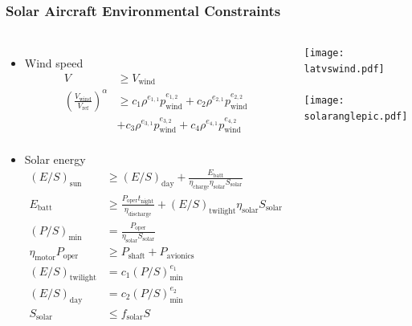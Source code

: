 \documentclass{beamer}
\begin{document}
\begin{frame}
    \frametitle{Solar Aircraft Environmental Constraints}
    
    \begin{columns}
    \tiny
    \begin{itemize}
        \item Wind speed
        \begin{align*}
            V & \geq V_{\text{wind}} \\
        \left(\frac{V_{\text{wind}}}{V_{\text{ref}}}\right)^{\alpha} &\geq c_1 \rho^{e_{1,1}}p_{\text{wind}}^{e_{1,2}} + c_2 \rho^{e_{2,1}}p_{\text{wind}}^{e_{2,2}} \\
                                                                     &+ c_3 \rho^{e_{3,1}}p_{\text{wind}}^{e_{3,2}} + c_4 \rho^{e_{4,1}}p_{\text{wind}}^{e_{4,2}} \\
\end{align*}
    
        \item Solar energy
        \begin{align*}
        (E/S)_{\text{sun}}  &\geq (E/S)_{\text{day}} + \frac{E_{\text{batt}}}{\eta_{\text{charge}}\eta_{\text{solar}} S_{\text{solar}}} \\
    E_{\text{batt}} &\geq \frac{P_{\text{oper}}t_{\text{night}}}{\eta_{\text{discharge}}} + (E/S)_{\text{twilight}} \eta_{\text{solar}} S_{\text{solar}} \\
    (P/S)_{\text{min}} &= \frac{P_{\text{oper}}}{\eta_{\text{solar}} S_{\text{solar}}} \\
    \eta_{\text{motor}} P_{\text{oper}} &\geq P_{\text{shaft}} + P_{\text{avionics}}\\
            (E/S)_{\text{twilight}} &= c_1 (P/S)_{\text{min}}^{e_1} \\
            (E/S)_{\text{day}} &= c_2(P/S)_{\text{min}}^{e_2} \\
            S_{\text{solar}} & \leq f_{\text{solar}}S
        \end{align*}
    \end{itemize}
        
        \texttt{[image: latvswind.pdf]} \\~\\
        \texttt{[image: solaranglepic.pdf]}

\end{columns}

\end{frame}
\end{document}
